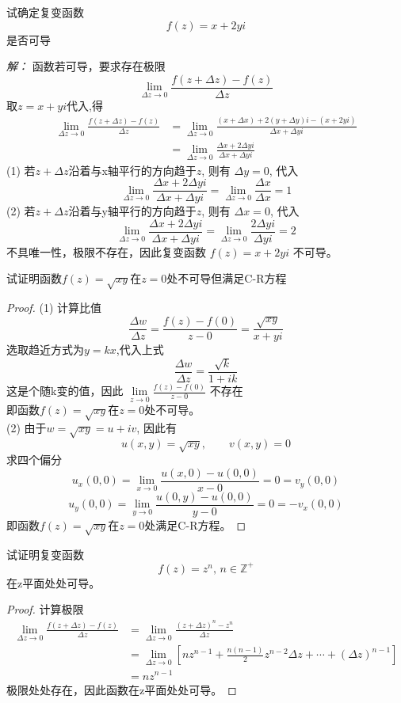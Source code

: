 \begin{example}
    试确定复变函数
  \[ f(z) = x + 2y i\]
  是否可导
\end{example}
\emph{解：} 函数若可导，要求存在极限
\[\lim_{\Delta z \to 0 }  \frac{f(z +  \Delta z) - f(z)}{\Delta z} \]
取$z= x+yi$代入,得
\[ \begin{aligned}
  \lim_{\Delta z \to 0 }  \frac{f(z +  \Delta z) - f(z)}{\Delta z}  &= \lim_{\Delta z \to 0 }  \frac{(x +  \Delta x)  + 2(y +  \Delta y) i  - (x + 2y i )}{\Delta x + \Delta y i}  \\ 
  &= \lim_{\Delta z \to 0 } \frac{\Delta x + 2 \Delta y i} {\Delta x +  \Delta y i} 
\end{aligned}\]
(1) 若$z+ \Delta z$沿着与x轴平行的方向趋于$z$, 则有 $\Delta y =0$, 代入 
\[ \lim_{\Delta z \to 0 } \frac{\Delta x + 2 \Delta y i} {\Delta x +  \Delta y i}  =  \lim_{\Delta z \to 0 } \frac{\Delta x } {\Delta x }  =1 \]
(2) 若$z+ \Delta z$沿着与y轴平行的方向趋于$z$, 则有 $\Delta x =0$, 代入 
\[ \lim_{\Delta z \to 0 } \frac{\Delta x + 2 \Delta y i} {\Delta x +  \Delta y i}  =  \lim_{\Delta z \to 0 } \frac{2 \Delta y i } {\Delta y i }  =2 \]
不具唯一性，极限不存在，因此复变函数 $f(z) = x + 2y i$ 不可导。

\begin{example}
  试证明函数$f(z) = \sqrt{xy}$在$z=0$处不可导但满足C-R方程
\end{example}
\begin{proof}
  (1) 计算比值 
  \[ \frac{\Delta w  }{\Delta z } = \frac{f(z) -f(0) }{z -0 } =  \frac{\sqrt{xy}}{x+yi } \]
  选取趋近方式为$y=kx$,代入上式 
  \[ \frac{\Delta w  }{\Delta z } = \frac{\sqrt{k}}{1+ik } \]
  这是个随k变的值，因此 $\lim\limits_{z \to 0} \frac{f(z) -f(0) }{z -0 } $ 不存在\\
  即函数$f(z) = \sqrt{xy}$在$z=0$处不可导。\\ 
  (2) 由于$w=\sqrt{xy} = u +i v $, 因此有 
  \[ u(x,y) = \sqrt{xy}, \qquad v(x,y)=0\]
  求四个偏分
  \[u_x(0,0) = \lim\limits_{x \to 0} \frac{u(x,0) -u(0,0) }{x -0 } =0 = v_y(0,0) \]
  \[u_y(0,0) = \lim\limits_{y \to 0} \frac{u(0,y) -u(0,0) }{y -0 } =0 = -v_x(0,0) \]
  即函数$f(z) = \sqrt{xy}$在$z=0$处满足C-R方程。
\end{proof}

\begin{example}
    试证明复变函数
    \[ f(z) = z ^n, \, n \in \mathbb{Z}^+\]
    在z平面处处可导。
\end{example}
\begin{proof}
    计算极限
  \[ \begin{aligned}
    \lim_{\Delta z \to 0 }  \frac{f(z +  \Delta z) - f(z)}{\Delta z}  
    &=   \lim_{\Delta z \to 0 }  \frac{(z +  \Delta z)^n - z^n}{\Delta z}  \\
    &=    \lim_{\Delta z \to 0 } \left[n z^{n-1} + \frac{n(n-1)}{2}z^{n-2} \Delta z + \cdots + (\Delta z)^{n-1} \right] \\
    &= n z^{n-1} 
  \end{aligned}\]
  极限处处存在，因此函数在z平面处处可导。
\end{proof}

